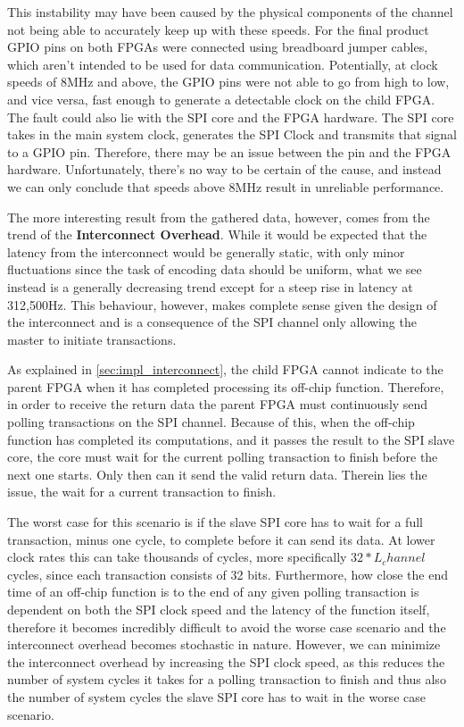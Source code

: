This instability may have been caused by the physical components of the channel not being able to accurately keep up with these speeds. For the final product GPIO pins on both FPGAs were connected using breadboard jumper cables, which aren't intended to be used for data communication. Potentially, at clock speeds of 8MHz and above, the GPIO pins were not able to go from high to low, and vice versa, fast enough to generate a detectable clock on the child FPGA. The fault could also lie with the SPI core and the FPGA hardware. The SPI core takes in the main system clock, generates the SPI Clock and transmits that signal to a GPIO pin. Therefore, there may be an issue between the pin and the FPGA hardware. Unfortunately, there's no way to be certain of the cause, and instead we can only conclude that speeds above 8MHz result in unreliable performance. 

The more interesting result from the gathered data, however, comes from the trend of the \textbf{Interconnect Overhead}. While it would be expected that the latency from the interconnect would be generally static, with only minor fluctuations since the task of encoding data should be uniform, what we see instead is a generally decreasing trend except for a steep rise in latency at 312,500Hz. This behaviour, however, makes complete sense given the design of the interconnect and is a consequence of the SPI channel only allowing the master to initiate transactions. 

As explained in \autoref{sec:impl_interconnect}, the child FPGA cannot indicate to the parent FPGA when it has completed processing its off-chip function. Therefore, in order to receive the return data the parent FPGA must continuously send polling transactions on the SPI channel. Because of this, when the off-chip function has completed its computations, and it passes the result to the SPI slave core, the core must wait for the current polling transaction to finish before the next one starts. Only then can it send the valid return data. Therein lies the issue, the wait for a current transaction to finish.

The worst case for this scenario is if the slave SPI core has to wait for a full transaction, minus one cycle, to complete before it can send its data. At lower clock rates this can take thousands of cycles, more specifically $32 * L_channel$ cycles, since each transaction consists of 32 bits. Furthermore, how close the end time of an off-chip function is to the end of any given polling transaction is dependent on both the SPI clock speed and the latency of the function itself, therefore it becomes incredibly difficult to avoid the worse case scenario and the interconnect overhead becomes stochastic in nature. However, we can minimize the interconnect overhead by increasing the SPI clock speed, as this reduces the number of system cycles it takes for a polling transaction to finish and thus also the number of system cycles the slave SPI core has to wait in the worse case scenario.

